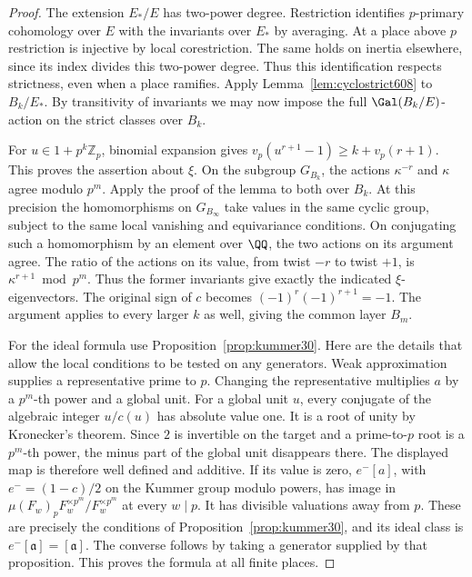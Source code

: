 \documentclass[a4paper,11pt]{article}
\theoremstyle{definition}
\theoremstyle{remark}
\newcommand{\ZZ}{\mathbb Z}\newcommand{\ord}{\operatorname{ord}}
\numberwithin{equation}{section}
\begin{document}
\begin{proof}
The extension \(E_*/E\) has two-power degree. Restriction
identifies \(p\)-primary cohomology over \(E\) with the
invariants over \(E_*\) by averaging. At a place above \(p\)
restriction is injective by local corestriction. The same
holds on inertia elsewhere, since its index divides this
two-power degree. Thus this identification respects strictness,
even when a place ramifies. Apply Lemma~\ref{lem:cyclostrict608}
to \(B_k/E_*\). By transitivity of invariants we may now impose
the full \(\Gal(B_k/E)\)-action on the strict classes over \(B_k\).

For \(u\in1+p^k\ZZ_p\), binomial expansion gives
\(v_p(u^{r+1}-1)\ge k+v_p(r+1)\). This proves the assertion
about \(\xi\). On the subgroup \(G_{B_k}\), the actions
\(\kappa^{-r}\) and \(\kappa\) agree modulo \(p^m\).
Apply the proof of the lemma to both over \(B_k\).
At this precision the homomorphisms on \(G_{B_\infty}\) take
values in the same cyclic group, subject to the same local
vanishing and equivariance conditions. On conjugating such a
homomorphism by an element over \(\QQ\), the two actions on its
argument agree. The ratio of the actions on its value, from
twist \(-r\) to twist \(+1\), is \(\kappa^{r+1}\bmod p^m\).
Thus the former invariants give exactly the indicated
\(\xi\)-eigenvectors. The original sign of \(c\) becomes
\((-1)^r(-1)^{r+1}=-1\). The argument applies to every larger
\(k\) as well, giving the common layer \(B_m\).

For the ideal formula use Proposition~\ref{prop:kummer30}.
Here are the details that allow the local conditions to be
tested on any generators. Weak approximation supplies a
representative prime to \(p\). Changing the representative
multiplies \(a\) by a \(p^m\)-th power and a global unit.
For a global unit \(u\), every conjugate of the algebraic
integer \(u/c(u)\) has absolute value one. It is a root of
unity by Kronecker's theorem. Since \(2\) is invertible on
the target and a prime-to-\(p\) root is a \(p^m\)-th power,
the minus part of the global unit disappears there.
The displayed map is therefore well defined and additive.
If its value is zero, \(e^-[a]\), with \(e^-=(1-c)/2\)
on the Kummer group modulo powers, has image in
\(\mu(F_w)_p F_w^{\times p^m}/F_w^{\times p^m}\) at every
\(w\mid p\). It has divisible valuations away from \(p\).
These are precisely the conditions of Proposition~\ref{prop:kummer30},
and its ideal class is \(e^-[\mathfrak a]=[\mathfrak a]\).
The converse follows by taking a generator supplied by that
proposition. This proves the formula at all finite places.
\end{proof}
\end{document}
